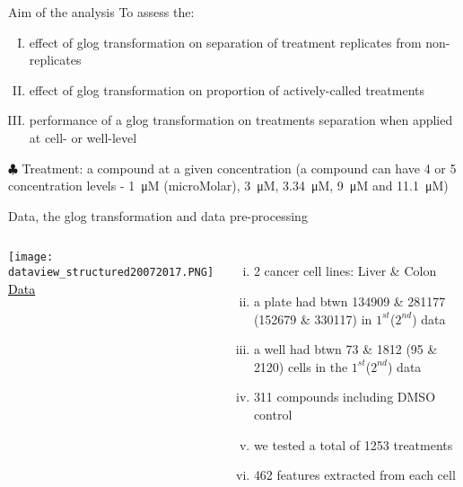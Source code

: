 \documentclass[11pt]{beamer}
\begin{document}
\begin{frame}{Aim of the analysis}
To assess the:
\begin{enumerate}[I. ]
\item effect of glog transformation on separation of treatment replicates from non-replicates
\item effect of glog transformation on proportion of actively-called treatments
\item performance of a glog transformation on treatments separation when applied at cell- or well-level
\end{enumerate} 
\vspace{4mm}
$\clubsuit$ Treatment: a compound at a given concentration (a compound can have 4 or 5 concentration levels - \SI{1}{\micro M} (microMolar), \SI{3}{\micro M}, \SI{3.34}{\micro M}, \SI{9}{\micro M} and \SI{11.1}{\micro M})
\end{frame}

\begin{frame}{Data, the glog transformation and data pre-processing}
       \begin{columns}
             \centering
         \texttt{[image: dataview\_structured20072017.PNG]}
         \textcolor{black}{\underline{Data}}
         \begin{enumerate}[i.]
         \item{2 cancer cell lines: Liver \& Colon } 
         \item{a plate had btwn 134909 \& 281177 (152679 \& 330117) in $1^{st}$($2^{nd}$) data}
        \item {a well had btwn 73 \& 1812 (95 \& 2120) cells in the $1^{st}$($2^{nd}$) data}
        \item 311 compounds including DMSO control
        \item {we tested a total of 1253 treatments}
        \item 462 features extracted from each cell
        \end{enumerate}
         \end{columns}
\end{frame}
\end{document}
